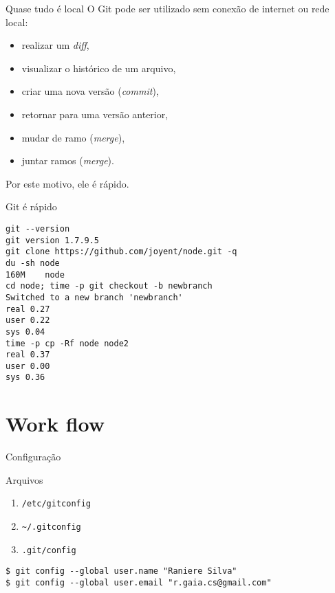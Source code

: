 \documentclass[11pt]{beamer}
\begin{document}
\begin{frame}{Quase tudo é local}
    O Git pode ser utilizado sem conexão de internet ou rede local:
    \begin{itemize}
        \item realizar um \textit{diff}, \pause
        \item visualizar o histórico de um arquivo, \pause
        \item criar uma nova versão (\textit{commit}), \pause
        \item retornar para uma versão anterior, \pause
        \item mudar de ramo (\textit{merge}), \pause
        \item juntar ramos (\textit{merge}). \pause
    \end{itemize}

    Por este motivo, ele é rápido.
\end{frame}

\begin{frame}[fragile]{Git é rápido}
    \begin{lstlisting}
git --version
git version 1.7.9.5
git clone https://github.com/joyent/node.git -q
du -sh node
160M    node
cd node; time -p git checkout -b newbranch
Switched to a new branch 'newbranch'
real 0.27
user 0.22
sys 0.04
time -p cp -Rf node node2
real 0.37
user 0.00
sys 0.36
    \end{lstlisting}
\end{frame}

\section{Work flow}
\begin{frame}[fragile]{Configuração}
    \begin{block}{Arquivos}
        \begin{enumerate}
            \item  \lstinline+/etc/gitconfig+
            \item  \lstinline+~/.gitconfig+
            \item  \lstinline+.git/config+
        \end{enumerate}
    \end{block}
    \pause

    \begin{lstlisting}
$ git config --global user.name "Raniere Silva"
$ git config --global user.email "r.gaia.cs@gmail.com"
    \end{lstlisting}
\end{frame}
\end{document}
